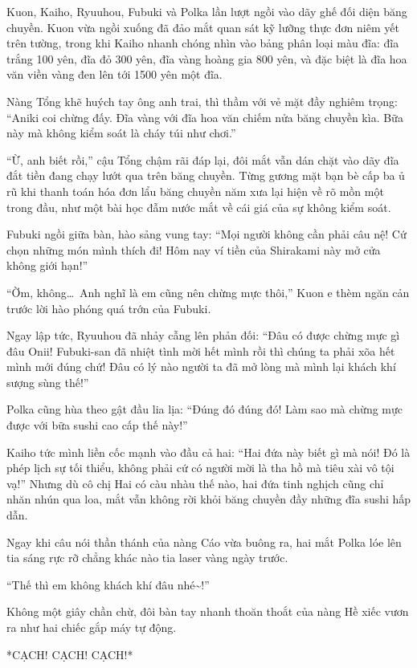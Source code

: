 \documentclass[../main.tex]{subfiles}
\begin{document}
Kuon, Kaiho, Ryuuhou, Fubuki và Polka lần lượt ngồi vào dãy ghế đối diện băng chuyền. Kuon vừa ngồi xuống đã đảo mắt quan sát kỹ lưỡng thực đơn niêm yết trên tường, trong khi Kaiho nhanh chóng nhìn vào bảng phân loại màu đĩa: đĩa trắng 100 yên, đĩa đỏ 300 yên, đĩa vàng hoàng gia 800 yên, và đặc biệt là đĩa hoa văn viền vàng đen lên tới 1500 yên một đĩa.

Nàng Tổng khẽ huých tay ông anh trai, thì thầm với vẻ mặt đầy nghiêm trọng: ``Aniki coi chừng đấy. Đĩa vàng với đĩa hoa văn chiếm nửa băng chuyền kìa. Bữa này mà không kiểm soát là cháy túi như chơi.''

``Ừ, anh biết rồi,'' cậu Tổng chậm rãi đáp lại, đôi mắt vẫn dán chặt vào dãy đĩa đắt tiền đang chạy lướt qua trên băng chuyền. Từng gương mặt bạn bè cấp ba ủ rũ khi thanh toán hóa đơn lẩu băng chuyền năm xưa lại hiện về rõ mồn một trong đầu, như một bài học đẫm nước mắt về cái giá của sự không kiểm soát.

Fubuki ngồi giữa bàn, hào sảng vung tay: ``Mọi người không cần phải câu nệ! Cứ chọn những món mình thích đi! Hôm nay ví tiền của Shirakami này mở cửa không giới hạn!''

``Ờm, không\dots\ Anh nghĩ là em cũng nên chừng mực thôi,'' Kuon e thèm ngăn cản trước lời hào phóng quá trớn của Fubuki.

Ngay lập tức, Ryuuhou đã nhảy cẫng lên phản đối: ``Đâu có được chừng mực gì đâu Onii! Fubuki-san đã nhiệt tình mời hết mình rồi thì chúng ta phải xõa hết mình mới đúng chứ! Đâu có lý nào người ta đã mở lòng mà mình lại khách khí sượng sùng thế!''

Polka cũng hùa theo gật đầu lia lịa: ``Đúng đó đúng đó! Làm sao mà chừng mực được với bữa sushi cao cấp thế này!''

Kaiho tức mình liền cốc mạnh vào đầu cả hai: ``Hai đứa này biết gì mà nói! Đó là phép lịch sự tối thiểu, không phải cứ có người mời là tha hồ mà tiêu xài vô tội vạ!'' Nhưng dù cô chị Hai có càu nhàu thế nào, hai đứa tinh nghịch cũng chỉ nhăn nhún qua loa, mắt vẫn không rời khỏi băng chuyền đầy những đĩa sushi hấp dẫn.

Ngay khi câu nói thần thánh của nàng Cáo vừa buông ra, hai mắt Polka lóe lên tia sáng rực rỡ chẳng khác nào tia laser vàng ngày trước.

``Thế thì em không khách khí đâu nhé\~{}!''

Không một giây chần chừ, đôi bàn tay nhanh thoăn thoắt của nàng Hề xiếc vươn ra như hai chiếc gắp máy tự động.

*CẠCH! CẠCH! CẠCH!*
\end{document}
